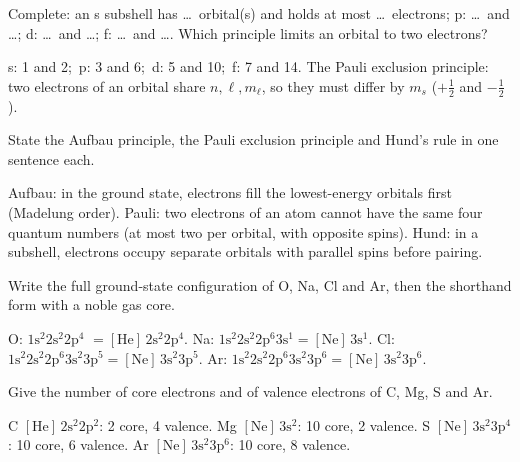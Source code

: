 
Complete: an s subshell has \dots\ orbital(s) and holds at most \dots\ electrons; p: \dots\ and
\dots; d: \dots\ and \dots; f: \dots\ and \dots. Which principle limits an orbital to two electrons?
\begin{solution}
s: 1 and 2;\ p: 3 and 6;\ d: 5 and 10;\ f: 7 and 14. The Pauli exclusion principle: two electrons of an
orbital share $n,\ell,m_\ell$, so they must differ by $m_s$ ($+\frac12$ and $-\frac12$).
\end{solution}

State the Aufbau principle, the Pauli exclusion principle and Hund's rule in one sentence each.
\begin{solution}
Aufbau: in the ground state, electrons fill the lowest-energy orbitals first (Madelung order).
Pauli: two electrons of an atom cannot have the same four quantum numbers (at most two per orbital,
with opposite spins). Hund: in a subshell, electrons occupy separate orbitals with parallel spins
before pairing.
\end{solution}

Write the full ground-state configuration of O, Na, Cl and Ar, then the shorthand form with a noble
gas core.
\begin{solution}
O: $1\mathrm s^2 2\mathrm s^2 2\mathrm p^4$ $= [\mathrm{He}]\,2\mathrm s^2 2\mathrm p^4$.\quad
Na: $1\mathrm s^2 2\mathrm s^2 2\mathrm p^6 3\mathrm s^1 = [\mathrm{Ne}]\,3\mathrm s^1$.\quad
Cl: $1\mathrm s^2 2\mathrm s^2 2\mathrm p^6 3\mathrm s^2 3\mathrm p^5 = [\mathrm{Ne}]\,3\mathrm s^2 3\mathrm p^5$.\quad
Ar: $1\mathrm s^2 2\mathrm s^2 2\mathrm p^6 3\mathrm s^2 3\mathrm p^6 = [\mathrm{Ne}]\,3\mathrm s^2 3\mathrm p^6$.
\end{solution}

Give the number of core electrons and of valence electrons of C, Mg, S and Ar.
\begin{solution}
C $[\mathrm{He}]\,2\mathrm s^2 2\mathrm p^2$: 2 core, 4 valence.\quad
Mg $[\mathrm{Ne}]\,3\mathrm s^2$: 10 core, 2 valence.\quad
S $[\mathrm{Ne}]\,3\mathrm s^2 3\mathrm p^4$: 10 core, 6 valence.\quad
Ar $[\mathrm{Ne}]\,3\mathrm s^2 3\mathrm p^6$: 10 core, 8 valence.
\end{solution}

